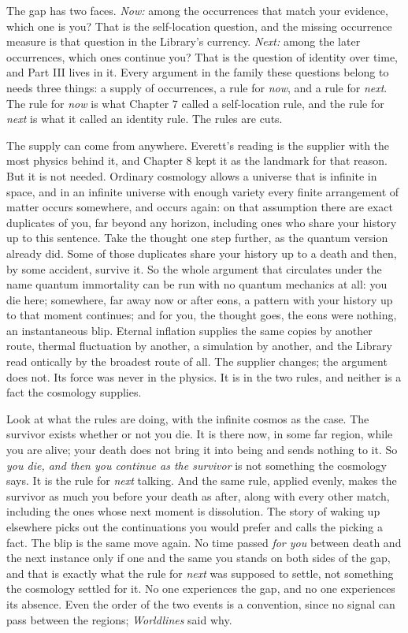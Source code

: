 The gap has two faces. \emph{Now:} among the occurrences that match your evidence, which one is you? That is the self-location question, and the missing occurrence measure is that question in the Library's currency. \emph{Next:} among the later occurrences, which ones continue you? That is the question of identity over time, and Part III lives in it. Every argument in the family these questions belong to needs three things: a supply of occurrences, a rule for \emph{now}, and a rule for \emph{next}. The rule for \emph{now} is what Chapter 7 called a self-location rule, and the rule for \emph{next} is what it called an identity rule. The rules are cuts.

The supply can come from anywhere. Everett's reading is the supplier with the most physics behind it, and Chapter 8 kept it as the landmark for that reason. But it is not needed. Ordinary cosmology allows a universe that is infinite in space, and in an infinite universe with enough variety every finite arrangement of matter occurs somewhere, and occurs again: on that assumption there are exact duplicates of you, far beyond any horizon, including ones who share your history up to this sentence. Take the thought one step further, as the quantum version already did. Some of those duplicates share your history up to a death and then, by some accident, survive it. So the whole argument that circulates under the name quantum immortality can be run with no quantum mechanics at all: you die here; somewhere, far away now or after eons, a pattern with your history up to that moment continues; and for you, the thought goes, the eons were nothing, an instantaneous blip. Eternal inflation supplies the same copies by another route, thermal fluctuation by another, a simulation by another, and the Library read ontically by the broadest route of all. The supplier changes; the argument does not. Its force was never in the physics. It is in the two rules, and neither is a fact the cosmology supplies.

Look at what the rules are doing, with the infinite cosmos as the case. The survivor exists whether or not you die. It is there now, in some far region, while you are alive; your death does not bring it into being and sends nothing to it. So \emph{you die, and then you continue as the survivor} is not something the cosmology says. It is the rule for \emph{next} talking. And the same rule, applied evenly, makes the survivor as much you before your death as after, along with every other match, including the ones whose next moment is dissolution. The story of waking up elsewhere picks out the continuations you would prefer and calls the picking a fact. The blip is the same move again. No time passed \emph{for you} between death and the next instance only if one and the same you stands on both sides of the gap, and that is exactly what the rule for \emph{next} was supposed to settle, not something the cosmology settled for it. No one experiences the gap, and no one experiences its absence. Even the order of the two events is a convention, since no signal can pass between the regions; \textit{Worldlines} said why.

